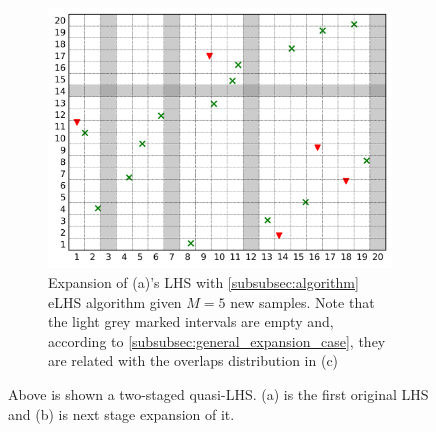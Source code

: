 \documentclass[12pt]{extarticle}
\begin{document}
\begin{figure}[]
\begin{subfigure}[b]{0.45\textwidth}
{        	\includegraphics[width=\textwidth]{src/imgs/algo4.png}
        	\captionsetup{skip=0pt}
        	\caption{Expansion of (a)'s LHS with \cref{subsubsec:algorithm} eLHS algorithm given $M = 5$ new samples. Note that the light grey marked intervals are empty and, according to \cref{subsubsec:general_expansion_case}, they are related with the overlaps distribution in (c)}
        	\label{fig:algo2}
        }
    \end{subfigure}
    \captionsetup{justification=centering}
    \caption*{Above is shown a two-staged quasi-LHS. (a) is the first original LHS and (b) is next stage expansion of it.}
    

\end{figure}
\end{document}
